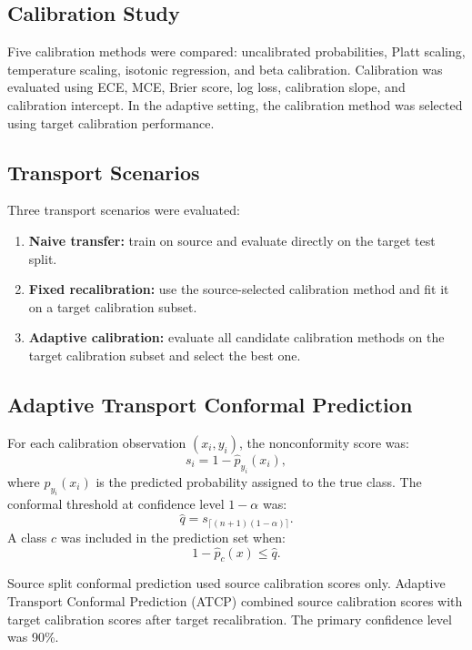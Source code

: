 \documentclass[11pt]{article}
\begin{document}
\subsection{Calibration Study}
Five calibration methods were compared: uncalibrated probabilities, Platt scaling, temperature scaling, isotonic regression, and beta calibration. Calibration was evaluated using ECE, MCE, Brier score, log loss, calibration slope, and calibration intercept. In the adaptive setting, the calibration method was selected using target calibration performance.

\subsection{Transport Scenarios}
Three transport scenarios were evaluated:
\begin{enumerate}[leftmargin=*]
    \item \textbf{Naive transfer:} train on source and evaluate directly on the target test split.
    \item \textbf{Fixed recalibration:} use the source-selected calibration method and fit it on a target calibration subset.
    \item \textbf{Adaptive calibration:} evaluate all candidate calibration methods on the target calibration subset and select the best one.
\end{enumerate}

\subsection{Adaptive Transport Conformal Prediction}
For each calibration observation $(x_i,y_i)$, the nonconformity score was:
\begin{equation}
s_i = 1 - \hat{p}_{y_i}(x_i),
\end{equation}
where $\hat{p}_{y_i}(x_i)$ is the predicted probability assigned to the true class. The conformal threshold at confidence level $1-\alpha$ was:
\begin{equation}
\hat{q} = s_{\lceil(n+1)(1-\alpha)\rceil}.
\end{equation}
A class $c$ was included in the prediction set when:
\begin{equation}
1 - \hat{p}_c(x) \leq \hat{q}.
\end{equation}

Source split conformal prediction used source calibration scores only. Adaptive Transport Conformal Prediction (ATCP) combined source calibration scores with target calibration scores after target recalibration. The primary confidence level was 90\%.
\end{document}

